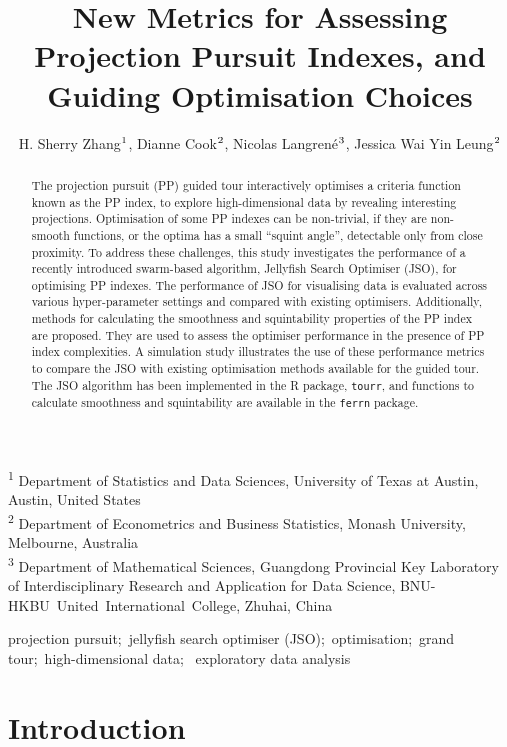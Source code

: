 \documentclass[
  12pt,
]{interact}
\title{New Metrics for Assessing Projection Pursuit Indexes, and Guiding
Optimisation Choices}
\author{H. Sherry Zhang$\textsuperscript{1}$, Dianne
Cook$\textsuperscript{2}$, Nicolas
Langrené$\textsuperscript{3}$, Jessica Wai Yin
Leung$\textsuperscript{2}$}
\theoremstyle{plain}
\begin{document}
\captionsetup{labelsep=space}
\maketitle
\textsuperscript{1} Department of Statistics and Data
Sciences, University of Texas at Austin, Austin, United
States\\ \textsuperscript{2} Department of Econometrics and Business
Statistics, Monash
University, Melbourne, Australia\\ \textsuperscript{3} Department of
Mathematical Sciences, Guangdong Provincial Key Laboratory of
Interdisciplinary Research and Application for Data Science,
BNU-HKBU~United~International~College, Zhuhai, China
\begin{abstract}
The projection pursuit (PP) guided tour interactively optimises a
criteria function known as the PP index, to explore high-dimensional
data by revealing interesting projections. Optimisation of some PP
indexes can be non-trivial, if they are non-smooth functions, or the
optima has a small ``squint angle'', detectable only from close
proximity. To address these challenges, this study investigates the
performance of a recently introduced swarm-based algorithm, Jellyfish
Search Optimiser (JSO), for optimising PP indexes. The performance of
JSO for visualising data is evaluated across various hyper-parameter
settings and compared with existing optimisers. Additionally, methods
for calculating the smoothness and squintability properties of the PP
index are proposed. They are used to assess the optimiser performance in
the presence of PP index complexities. A simulation study illustrates
the use of these performance metrics to compare the JSO with existing
optimisation methods available for the guided tour. The JSO algorithm
has been implemented in the R package, \texttt{tourr}, and functions to
calculate smoothness and squintability are available in the
\texttt{ferrn} package.
\end{abstract}
\begin{keywords}
\def\sep{;\ }
projection pursuit\sep jellyfish search optimiser
(JSO)\sep optimisation\sep grand tour\sep high-dimensional data\sep 
exploratory data analysis
\end{keywords}


\section{Introduction}\label{introduction}
\end{document}
